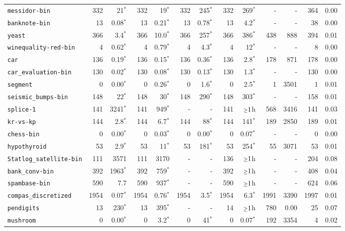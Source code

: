 \begin{tabular}{lrrrrrrrrrrrr}
\texttt{messidor-bin} & 332 & 21$^*$ & 332 & 19$^*$ & 332 & 245$^*$ & 332 & 269$^*$ & - & - & 364 & 0.00\\
\texttt{banknote-bin} & 13 & 0.08$^*$ & 13 & 0.21$^*$ & 13 & 0.78$^*$ & 13 & 4.2$^*$ & - & - & 38 & 0.00\\
\texttt{yeast} & 366 & 3.4$^*$ & 366 & 10.0$^*$ & 366 & 257$^*$ & 366 & 386$^*$ & 438 & 888 & 394 & 0.01\\
\texttt{winequality-red-bin} & 4 & 0.62$^*$ & 4 & 0.79$^*$ & 4 & 4.3$^*$ & 4 & 12$^*$ & - & - & 8 & 0.00\\
\texttt{car} & 136 & 0.19$^*$ & 136 & 0.15$^*$ & 136 & 0.36$^*$ & 136 & 2.8$^*$ & 178 & 871 & 178 & 0.00\\
\texttt{car\_evaluation-bin} & 130 & 0.02$^*$ & 130 & 0.08$^*$ & 130 & 0.13$^*$ & 130 & 1.3$^*$ & - & - & 130 & 0.00\\
\texttt{segment} & 0 & 0.00$^*$ & 0 & 0.26$^*$ & 0 & 1.6$^*$ & 0 & 2.5$^*$ & 1 & 3501 & 1 & 0.01\\
\texttt{seismic\_bumps-bin} & 148 & 22$^*$ & 148 & 30$^*$ & 148 & 290$^*$ & 148 & 303$^*$ & - & - & 158 & 0.01\\
\texttt{splice-1} & 141 & 3241$^*$ & 141 & 949$^*$ & - & - & 141 & $\mathsmaller{\geq}1$h & 568 & 3416 & 141 & 0.03\\
\texttt{kr-vs-kp} & 144 & 2.8$^*$ & 144 & 6.7$^*$ & 144 & 88$^*$ & 144 & 141$^*$ & 189 & 2850 & 189 & 0.01\\
\texttt{chess-bin} & 0 & 0.00$^*$ & 0 & 0.03$^*$ & 0 & 0.00$^*$ & 0 & 0.07$^*$ & - & - & 0 & 0.00\\
\texttt{hypothyroid} & 53 & 2.9$^*$ & 53 & 11$^*$ & 53 & 181$^*$ & 53 & 254$^*$ & 55 & 3071 & 53 & 0.01\\
\texttt{Statlog\_satellite-bin} & 111 & 3571 & 111 & 3170 & - & - & 136 & $\mathsmaller{\geq}1$h & - & - & 204 & 0.08\\
\texttt{bank\_conv-bin} & 392 & 1963$^*$ & 392 & 759$^*$ & - & - & 392 & $\mathsmaller{\geq}1$h & - & - & 408 & 0.04\\
\texttt{spambase-bin} & 590 & 7.7 & 590 & 937$^*$ & - & - & 590 & $\mathsmaller{\geq}1$h & - & - & 624 & 0.06\\
\texttt{compas\_discretized} & 1954 & 0.07$^*$ & 1954 & 0.76$^*$ & 1954 & 3.5$^*$ & 1954 & 6.3$^*$ & 1991 & 3390 & 1997 & 0.01\\
\texttt{pendigits} & 13 & 230$^*$ & 13 & 395$^*$ & - & - & 14 & $\mathsmaller{\geq}1$h & 780 & 0.00 & 25 & 0.07\\
\texttt{mushroom} & 0 & 0.00$^*$ & 0 & 3.2$^*$ & 0 & 41$^*$ & 0 & 0.07$^*$ & 192 & 3354 & 4 & 0.02\\

\end{tabular}

